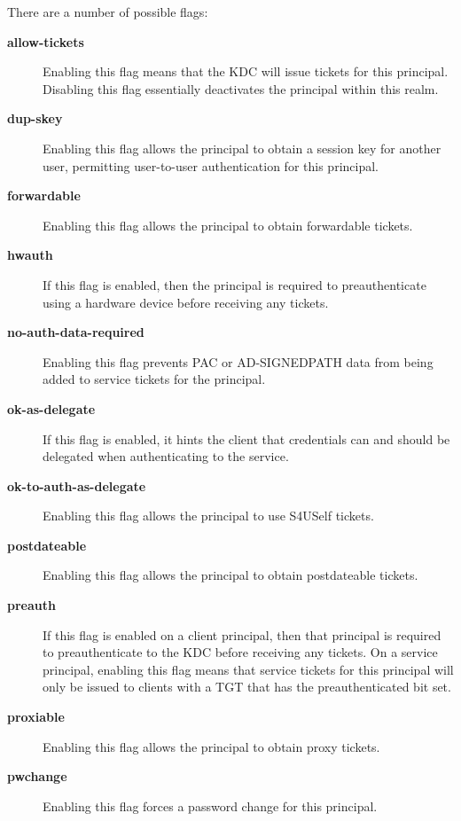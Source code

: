 \documentclass[letterpaper,10pt,english]{sphinxmanual}
\begin{document}
\begin{description}
There are a number of possible flags:
\begin{description}
\item[{\textbf{allow-tickets}}] \leavevmode
Enabling this flag means that the KDC will issue tickets for
this principal.  Disabling this flag essentially deactivates
the principal within this realm.

\item[{\textbf{dup-skey}}] \leavevmode
Enabling this flag allows the principal to obtain a session
key for another user, permitting user-to-user authentication
for this principal.

\item[{\textbf{forwardable}}] \leavevmode
Enabling this flag allows the principal to obtain forwardable
tickets.

\item[{\textbf{hwauth}}] \leavevmode
If this flag is enabled, then the principal is required to
preauthenticate using a hardware device before receiving any
tickets.

\item[{\textbf{no-auth-data-required}}] \leavevmode
Enabling this flag prevents PAC or AD-SIGNEDPATH data from
being added to service tickets for the principal.

\item[{\textbf{ok-as-delegate}}] \leavevmode
If this flag is enabled, it hints the client that credentials
can and should be delegated when authenticating to the
service.

\item[{\textbf{ok-to-auth-as-delegate}}] \leavevmode
Enabling this flag allows the principal to use S4USelf tickets.

\item[{\textbf{postdateable}}] \leavevmode
Enabling this flag allows the principal to obtain postdateable
tickets.

\item[{\textbf{preauth}}] \leavevmode
If this flag is enabled on a client principal, then that
principal is required to preauthenticate to the KDC before
receiving any tickets.  On a service principal, enabling this
flag means that service tickets for this principal will only
be issued to clients with a TGT that has the preauthenticated
bit set.

\item[{\textbf{proxiable}}] \leavevmode
Enabling this flag allows the principal to obtain proxy
tickets.

\item[{\textbf{pwchange}}] \leavevmode
Enabling this flag forces a password change for this
principal.


\end{description}
\end{description}
\end{document}
